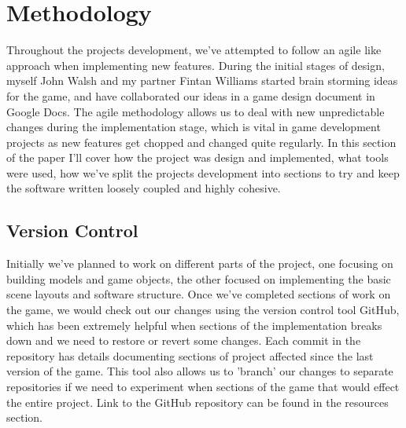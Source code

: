 \chapter{Methodology}
Throughout the projects development, we've attempted to follow an agile like approach when implementing new features. During the initial stages of design, myself John Walsh and my partner Fintan Williams started brain storming ideas for the game, and have collaborated our ideas in a game design document in Google Docs. The agile methodology allows us to deal with new unpredictable changes during the implementation stage, which is vital in game development projects as new features get chopped and changed quite regularly. In this section of the paper I'll cover how the project was design and implemented, what tools were used, how we've split the projects development into sections to try and keep the software written loosely coupled and highly cohesive.
\section{Version Control}
Initially we've planned to work on different parts of the project, one focusing on building models and game objects, the other focused on implementing the basic scene layouts and software structure. Once we've completed sections of work on the game, we would check out our changes using the version control tool GitHub, which has been extremely helpful when sections of the implementation breaks down and we need to restore or revert some changes. Each commit in the repository has details documenting sections of project affected since the last version of the game. This tool also allows us to 'branch' our changes to separate repositories if we need to experiment when sections of the game that would effect the entire project. Link to the GitHub repository can be found in the resources section.
